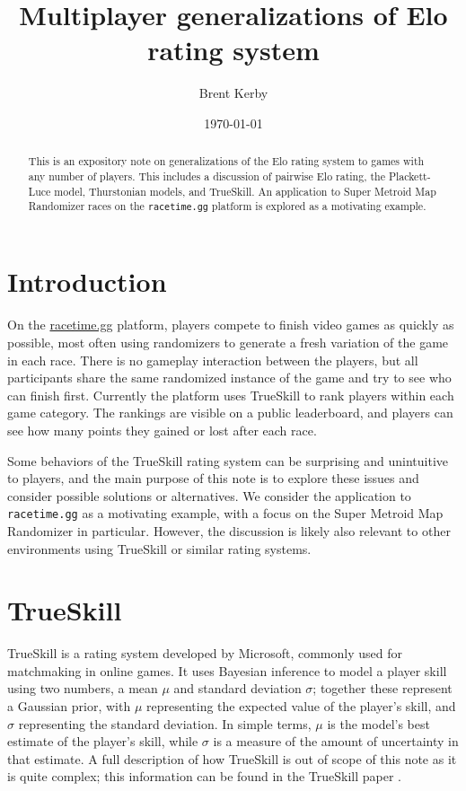 \documentclass{article}
\title{Multiplayer generalizations of Elo rating system}
\date{\today}
\author{Brent Kerby}
\begin{document}
	\maketitle
	\begin{abstract}
		This is an expository note on generalizations of the Elo rating system to games with any number of players. This
		includes a discussion of pairwise Elo rating, the Plackett-Luce model, Thurstonian models, and TrueSkill.
		An application to Super Metroid Map Randomizer races on the \texttt{racetime.gg} platform is explored as a motivating example. 
	\end{abstract}
	\section{Introduction}
	
	On the \href{https://racetime.gg}{racetime.gg} platform, players compete to finish video games as quickly as possible,
	most often using randomizers to generate a fresh variation of the game in each race. There is no gameplay interaction
	between the players, but all participants share the same randomized instance of the game and try to see who can finish first.
	Currently the platform uses TrueSkill to rank players within each game category. The rankings are visible on a public leaderboard,
	and players can see how many points they gained or lost after each race. 
	
	Some behaviors of the TrueSkill rating system can be surprising and unintuitive to players, and the main purpose of
	this note is to explore these issues and consider possible solutions or alternatives. We consider the application
	to \texttt{racetime.gg} as a motivating example, with a focus on the Super Metroid Map Randomizer in particular. 
	However, the discussion is likely also relevant to other environments using TrueSkill or similar rating systems.
	
	\section{TrueSkill}
	
	TrueSkill is a rating system developed by Microsoft, commonly used for matchmaking in online games. It uses Bayesian inference to
	model a player skill using two numbers, a mean $\mu$ and standard deviation $\sigma$; together these represent a Gaussian prior,
	with $\mu$ representing the expected value of the player's skill, and $\sigma$ representing the standard deviation.
	In simple terms, $\mu$ is the model's best estimate of the player's skill, while $\sigma$ is a measure of the amount of uncertainty in that estimate.
	A full description of how TrueSkill is out of scope of this note as it is quite complex; this information can be found in the 
	TrueSkill paper \cite{herbrich2006trueskill}.
	
\end{document}
